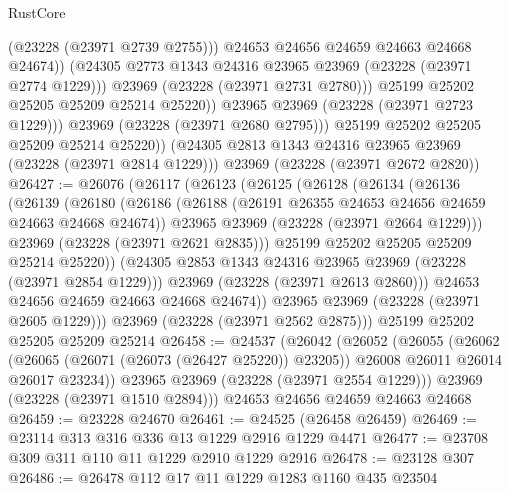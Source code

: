 \begin{lexlean}{RustCore}
\begin{coremodule}
                        (@23228 (@23971 @2739 @2755)))
                      @24653
                      @24656
                      @24659
                      @24663
                      @24668
                      @24674))
                  (@24305 @2773 @1343 @24316 @23965 @23969 (@23228 (@23971 @2774 @1229)))
                  @23969
                  (@23228 (@23971 @2731 @2780)))
                @25199
                @25202
                @25205
                @25209
                @25214
                @25220))
            @23965
            @23969
            (@23228 (@23971 @2723 @1229)))
          @23969
          (@23228 (@23971 @2680 @2795)))
        @25199
        @25202
        @25205
        @25209
        @25214
        @25220))
    (@24305 @2813 @1343 @24316 @23965 @23969 (@23228 (@23971 @2814 @1229)))
    @23969
    (@23228 (@23971 @2672 @2820))
@26427 := @26076
    (@26117
      (@26123
        (@26125
          (@26128
            (@26134
              (@26136
                (@26139
                  (@26180
                    (@26186
                      (@26188 (@26191 @26355 @24653 @24656 @24659 @24663 @24668 @24674))
                      @23965
                      @23969
                      (@23228 (@23971 @2664 @1229)))
                    @23969
                    (@23228 (@23971 @2621 @2835)))
                  @25199
                  @25202
                  @25205
                  @25209
                  @25214
                  @25220))
              (@24305 @2853 @1343 @24316 @23965 @23969 (@23228 (@23971 @2854 @1229)))
              @23969
              (@23228 (@23971 @2613 @2860)))
            @24653
            @24656
            @24659
            @24663
            @24668
            @24674))
        @23965
        @23969
        (@23228 (@23971 @2605 @1229)))
      @23969
      (@23228 (@23971 @2562 @2875)))
    @25199
    @25202
    @25205
    @25209
    @25214
@26458 := @24537
    (@26042
      (@26052
        (@26055
          (@26062
            (@26065 (@26071 (@26073 (@26427 @25220)) @23205))
            @26008
            @26011
            @26014
            @26017
            @23234))
        @23965
        @23969
        (@23228 (@23971 @2554 @1229)))
      @23969
      (@23228 (@23971 @1510 @2894)))
    @24653
    @24656
    @24659
    @24663
    @24668
@26459 := @23228 @24670
@26461 := @24525 (@26458 @26459)
@26469 := @23114 @313 @316 @336 @13 @1229 @2916 @1229 @4471
@26477 := @23708 @309 @311 @110 @11 @1229 @2910 @1229 @2916
@26478 := @23128 @307
@26486 := @26478 @112 @17 @11 @1229 @1283 @1160 @435 @23504

\end{coremodule}
\end{lexlean}
